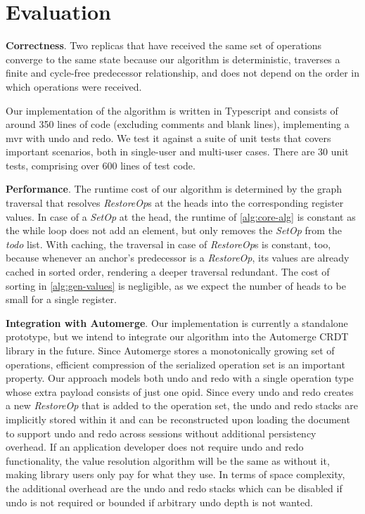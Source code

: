\documentclass[sigplan,10pt]{acmart}
\newcommand{\setopkind}{\textit{SetOp}}
\newcommand{\restopkind}{\textit{RestoreOp}}
\begin{document}
\section{Evaluation}\label{sec:evaluation}

\textbf{Correctness}.
Two replicas that have received the same set of
operations converge to the same state because our algorithm is deterministic,
traverses a finite and cycle-free predecessor relationship,
and does not depend on the order in which operations were received.

Our implementation of the algorithm is written in Typescript and
consists of around 350 lines of code (excluding comments and blank lines),
implementing a \gls*{mvr} with undo and redo.
We test it against a suite of unit tests that covers important
scenarios, both in single-user and multi-user cases.
There are 30 unit tests, comprising over 600 lines of test code.

\textbf{Performance}.
The runtime cost of our algorithm is determined by the graph traversal that
resolves \restopkind{}s at the heads into the corresponding register values.
In case of a \setopkind{} at the head, the runtime of \cref{alg:core-alg}
is constant as the while loop does not add an element, but only
removes the \setopkind{} from the \textit{todo} list.
With caching, the traversal in case of \restopkind{}s is constant, too,
because whenever an anchor's predecessor is a \restopkind{},
its values are already cached in sorted order,
rendering a deeper traversal redundant.
The cost of sorting in \cref{alg:gen-values} is negligible,
as we expect the number of heads to be small for a single register.

\textbf{Integration with Automerge}.
Our implementation is currently a standalone prototype, but we intend to
integrate our algorithm into the Automerge CRDT library in the future.
Since Automerge stores a monotonically growing set of operations,
efficient compression of the serialized operation set is an important property.
Our approach models both undo and redo with a single
operation type whose extra payload consists of just one \gls*{opid}.
Since every undo and redo creates a new \restopkind{} that is added
to the operation set,
the undo and redo stacks are implicitly stored within it and
can be reconstructed upon loading the document to support undo and redo
across sessions without additional persistency overhead.
If an application developer does not require undo and redo functionality,
the value resolution algorithm will be the same as without it,
making library users only pay for what they use.
In terms of space complexity, the additional overhead are
the undo and redo stacks which can be disabled if undo is not required or
bounded if arbitrary undo depth is not wanted.
\end{document}
